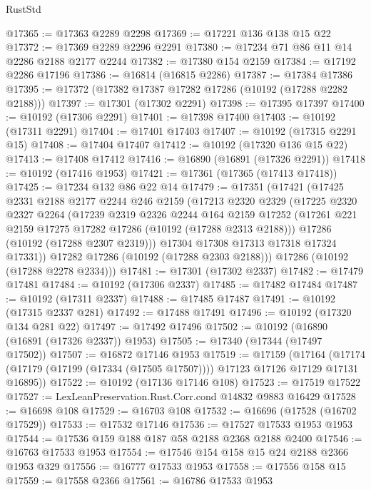 \begin{lexlean}{RustStd}
\begin{coremodule}
@17365 := @17363 @2289 @2298
@17369 := @17221 @136 @138 @15 @22
@17372 := @17369 @2289 @2296 @2291
@17380 := @17234 @71 @86 @11 @14 @2286 @2188 @2177 @2244
@17382 := @17380 @154 @2159
@17384 := @17192 @2286 @17196
@17386 := @16814 (@16815 @2286)
@17387 := @17384 @17386
@17395 := @17372 (@17382 @17387 @17282 @17286 (@10192 (@17288 @2282 @2188)))
@17397 := @17301 (@17302 @2291)
@17398 := @17395 @17397
@17400 := @10192 (@17306 @2291)
@17401 := @17398 @17400
@17403 := @10192 (@17311 @2291)
@17404 := @17401 @17403
@17407 := @10192 (@17315 @2291 @15)
@17408 := @17404 @17407
@17412 := @10192 (@17320 @136 @15 @22)
@17413 := @17408 @17412
@17416 := @16890 (@16891 (@17326 @2291))
@17418 := @10192 (@17416 @1953)
@17421 := @17361 (@17365 (@17413 @17418))
@17425 := @17234 @132 @86 @22 @14
@17479 := @17351
    (@17421
      (@17425
        @2331
        @2188
        @2177
        @2244
        @246
        @2159
        (@17213
          @2320
          @2329
          (@17225
            @2320
            @2327
            @2264
            (@17239
              @2319
              @2326
              @2244
              @164
              @2159
              @17252
              (@17261 @221 @2159 @17275 @17282 @17286 (@10192 (@17288 @2313 @2188)))
              @17286
              (@10192 (@17288 @2307 @2319)))
            @17304
            @17308
            @17313
            @17318
            @17324
            @17331))
        @17282
        @17286
        (@10192 (@17288 @2303 @2188)))
      @17286
      (@10192 (@17288 @2278 @2334)))
@17481 := @17301 (@17302 @2337)
@17482 := @17479 @17481
@17484 := @10192 (@17306 @2337)
@17485 := @17482 @17484
@17487 := @10192 (@17311 @2337)
@17488 := @17485 @17487
@17491 := @10192 (@17315 @2337 @281)
@17492 := @17488 @17491
@17496 := @10192 (@17320 @134 @281 @22)
@17497 := @17492 @17496
@17502 := @10192 (@16890 (@16891 (@17326 @2337)) @1953)
@17505 := @17340 (@17344 (@17497 @17502))
@17507 := @16872 @17146 @1953
@17519 := @17159
    (@17164 (@17174 (@17179 (@17199 (@17334 (@17505 @17507)))) @17123 @17126 @17129 @17131 @16895))
@17522 := @10192 (@17136 @17146 @108)
@17523 := @17519 @17522
@17527 := LexLeanPreservation.Rust.Corr.cond @14832 @9883 @16429
@17528 := @16698 @108
@17529 := @16703 @108
@17532 := @16696 (@17528 (@16702 @17529))
@17533 := @17532 @17146
@17536 := @17527 @17533 @1953 @1953
@17544 := @17536 @159 @188 @187 @58 @2188 @2368 @2188 @2400
@17546 := @16763 @17533 @1953
@17554 := @17546 @154 @158 @15 @24 @2188 @2366 @1953 @329
@17556 := @16777 @17533 @1953
@17558 := @17556 @158 @15
@17559 := @17558 @2366
@17561 := @16786 @17533 @1953

\end{coremodule}
\end{lexlean}
